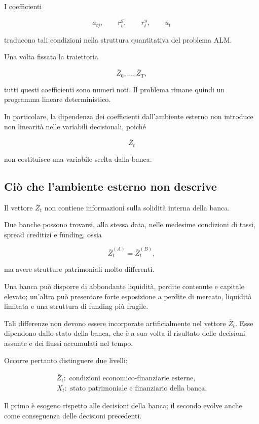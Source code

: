 I coefficienti

\[
a_{tj},\qquad r^g_t,\qquad r^u_t,\qquad \bar{u}_t
\]

\noindent traducono tali condizioni nella struttura quantitativa del problema ALM.

Una volta fissata la traiettoria

\[
\bar{Z}_0,\ldots,\bar{Z}_T,
\]

\noindent tutti questi coefficienti sono numeri noti. Il problema rimane quindi un
programma lineare deterministico.

In particolare, la dipendenza dei coefficienti dall'ambiente esterno non
introduce non linearit\`a nelle variabili decisionali, poich\'e

\[
\bar{Z}_t
\]

\noindent non costituisce una variabile scelta dalla banca.

\subsection{Ci\`o che l'ambiente esterno non descrive}

Il vettore $\bar{Z}_t$ non contiene informazioni sulla solidit\`a interna
della banca.

Due banche possono trovarsi, alla stessa data, nelle medesime condizioni di
tassi, spread creditizi e funding, ossia

\[
\bar{Z}_t^{(A)}
=
\bar{Z}_t^{(B)},
\]

\noindent ma avere strutture patrimoniali molto differenti.

Una banca pu\`o disporre di abbondante liquidit\`a, perdite contenute e
capitale elevato; un'altra pu\`o presentare forte esposizione a perdite di
mercato, liquidit\`a limitata e una struttura di funding pi\`u fragile.

Tali differenze non devono essere incorporate artificialmente nel vettore
$\bar{Z}_t$. Esse dipendono dallo stato della banca, che \`e a sua volta il
risultato delle decisioni assunte e dei flussi accumulati nel tempo.

Occorre pertanto distinguere due livelli:

\[
\boxed{
\begin{array}{c}
\bar{Z}_t:
\text{ condizioni economico-finanziarie esterne},\\[4pt]
X_t:
\text{ stato patrimoniale e finanziario della banca}.
\end{array}
}
\]

Il primo \`e esogeno rispetto alle decisioni della banca; il secondo evolve
anche come conseguenza delle decisioni precedenti.

